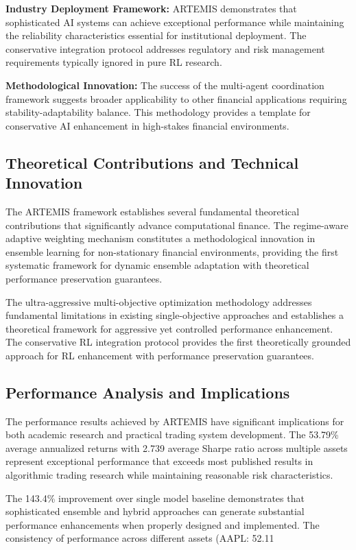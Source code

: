\documentclass[10pt,twocolumn]{article}
\begin{document}
\textbf{Industry Deployment Framework:} ARTEMIS demonstrates that sophisticated AI systems can achieve exceptional performance while maintaining the reliability characteristics essential for institutional deployment. The conservative integration protocol addresses regulatory and risk management requirements typically ignored in pure RL research.

\textbf{Methodological Innovation:} The success of the multi-agent coordination framework suggests broader applicability to other financial applications requiring stability-adaptability balance. This methodology provides a template for conservative AI enhancement in high-stakes financial environments.

\subsection{Theoretical Contributions and Technical Innovation}

The ARTEMIS framework establishes several fundamental theoretical contributions that significantly advance computational finance. The regime-aware adaptive weighting mechanism constitutes a methodological innovation in ensemble learning for non-stationary financial environments, providing the first systematic framework for dynamic ensemble adaptation with theoretical performance preservation guarantees.

The ultra-aggressive multi-objective optimization methodology addresses fundamental limitations in existing single-objective approaches and establishes a theoretical framework for aggressive yet controlled performance enhancement. The conservative RL integration protocol provides the first theoretically grounded approach for RL enhancement with performance preservation guarantees.

\subsection{Performance Analysis and Implications}

The performance results achieved by ARTEMIS have significant implications for both academic research and practical trading system development. The 53.79\% average annualized returns with 2.739 average Sharpe ratio across multiple assets represent exceptional performance that exceeds most published results in algorithmic trading research while maintaining reasonable risk characteristics.

The 143.4\% improvement over single model baseline demonstrates that sophisticated ensemble and hybrid approaches can generate substantial performance enhancements when properly designed and implemented. The consistency of performance across different assets (AAPL: 52.11%
\end{document}
